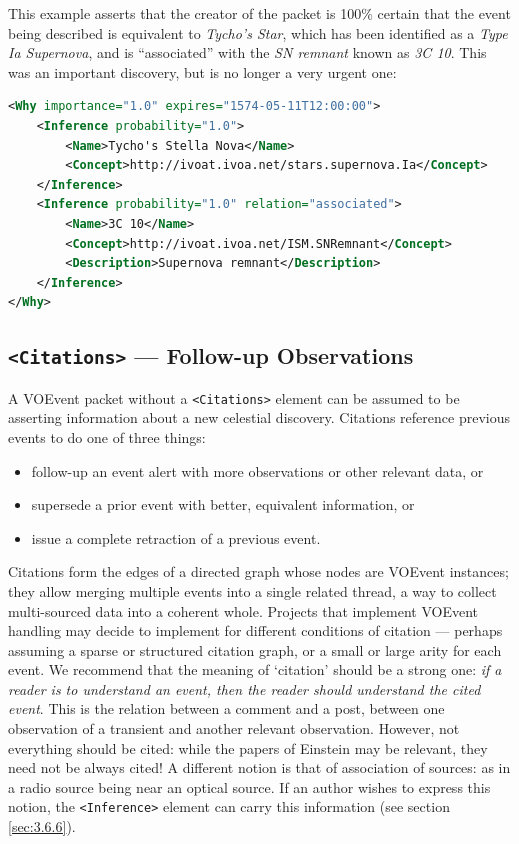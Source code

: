 \documentclass[11pt,a4paper]{ivoa}
\begin{document}
This example asserts that the creator of the packet is 100\% certain that the 
event being described is equivalent to \emph{Tycho's Star}, which has been 
identified as a \emph{Type Ia Supernova}, and is ``associated'' with the 
\emph{SN remnant} known as \emph{3C 10}. This was an important discovery, but 
is no longer a very urgent one: 
\begin{lstlisting}[language=XML]
<Why importance="1.0" expires="1574-05-11T12:00:00">
    <Inference probability="1.0">
        <Name>Tycho's Stella Nova</Name>
        <Concept>http://ivoat.ivoa.net/stars.supernova.Ia</Concept>
    </Inference>     
    <Inference probability="1.0" relation="associated">
        <Name>3C 10</Name>
        <Concept>http://ivoat.ivoa.net/ISM.SNRemnant</Concept>
        <Description>Supernova remnant</Description>
    </Inference>
</Why> 
\end{lstlisting}

\subsection{{\tt <Citations>} --- Follow-up Observations}
\label{sec:3.7}
A VOEvent packet without a {\tt <Citations>} element can be assumed to be 
asserting information about a new celestial discovery. Citations reference 
previous events to do one of three things: 
\begin{itemize}
\item follow-up an event alert with more observations or other relevant data, or
\item supersede a prior event with better, equivalent information, or
\item issue a complete retraction of a previous event.
\end{itemize}

Citations form the edges of a directed graph whose nodes are VOEvent instances; 
they allow merging multiple events into a single related thread, a way to 
collect multi-sourced data into a coherent whole. Projects that implement 
VOEvent handling may decide to implement for different conditions of citation 
--- perhaps assuming a sparse or structured citation graph, or a small or large 
arity for each event. We recommend that the meaning of `citation' should be a 
strong one: \emph{if a reader is to understand an event, then the reader should 
understand the cited event}. This is the relation between a comment and a post, 
between one observation of a transient and another relevant observation. 
However, not everything should be cited: while the papers of Einstein may be 
relevant, they need not be always cited! A different notion is that of 
association of sources: as in a radio source being near an optical source. If an
author wishes to express this notion, the {\tt <Inference>} element can carry 
this information (see section \ref{sec:3.6.6}). 
\end{document}
